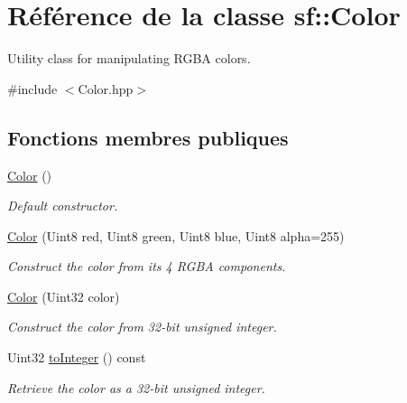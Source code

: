 \hypertarget{classsf_1_1Color}{}\section{Référence de la classe sf\+:\+:Color}
\label{classsf_1_1Color}


Utility class for manipulating R\+G\+BA colors.  




{\ttfamily \#include $<$Color.\+hpp$>$}

\subsection*{Fonctions membres publiques}
\begin{DoxyCompactItemize}
\item 
\hyperlink{classsf_1_1Color_ac2eb4393fb11ad3fa3ccf34e92fe08e4}{Color} ()
\begin{DoxyCompactList}\small\item\em Default constructor. \end{DoxyCompactList}\item 
\hyperlink{classsf_1_1Color_ac791dc61be4c60baac50fe700f1c9850}{Color} (Uint8 red, Uint8 green, Uint8 blue, Uint8 alpha=255)
\begin{DoxyCompactList}\small\item\em Construct the color from its 4 R\+G\+BA components. \end{DoxyCompactList}\item 
\hyperlink{classsf_1_1Color_a5449f4b2b9a78230d40ce2c223c9ab2e}{Color} (Uint32 color)
\begin{DoxyCompactList}\small\item\em Construct the color from 32-\/bit unsigned integer. \end{DoxyCompactList}\item 
Uint32 \hyperlink{classsf_1_1Color_abb46e6942c4fe0d221574a46e642caa9}{to\+Integer} () const
\begin{DoxyCompactList}\small\item\em Retrieve the color as a 32-\/bit unsigned integer. \end{DoxyCompactList}\end{DoxyCompactItemize}
